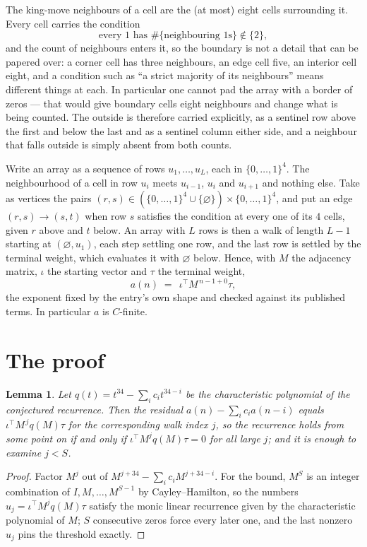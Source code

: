 \documentclass[11pt,a4paper]{article}
\theoremstyle{plain}
\newtheorem{lemma}[theorem]{Lemma}
\theoremstyle{definition}
\begin{document}
The king-move neighbours of a cell are the (at most) eight cells surrounding it. Every cell
carries the condition
\[
\text{every }1\text{ has }\#\{\text{neighbouring }1\text{s}\}\notin\{2\},
\]
and the count of neighbours enters it, so the boundary is not a detail that can be papered
over: a corner cell has three neighbours, an edge cell five, an interior cell eight, and a
condition such as ``a strict majority of its neighbours'' means different things at each. In
particular one cannot pad the array with a border of zeros --- that would give boundary cells
eight neighbours and change what is being counted. The outside is therefore carried
explicitly, as a sentinel row above the first and below the last and as a sentinel column
either side, and a neighbour that falls outside is simply absent from both counts.

Write an array as a sequence of rows $u_1,\dots,u_L$, each in
$\{0,\dots,1\}^{4}$. The neighbourhood of a cell in row $u_i$ meets $u_{i-1}$,
$u_i$ and $u_{i+1}$ and nothing else. Take as vertices the pairs
$(r,s)\in(\{0,\dots,1\}^{4}\cup\{\varnothing\})\times\{0,\dots,1\}^{4}$,
and put an edge $(r,s)\to(s,t)$ when row $s$ satisfies the condition at every one of its
$4$ cells, given $r$ above and $t$ below. An array with $L$ rows is then a walk of length
$L-1$ starting at $(\varnothing,u_1)$, each step settling one row, and the last row is
settled by the terminal weight, which evaluates it with $\varnothing$ below. Hence,
with $M$ the adjacency matrix, $\iota$ the starting vector and $\tau$ the terminal weight,
\[
a(n)\;=\;\,\iota^{\!\top}M^{\,n-1+0}\tau ,
\]
the exponent fixed by the entry's own shape and checked against its published terms. In
particular $a$ is $C$-finite.

\section{The proof}

\begin{lemma}\label{lem:crit}
Let $q(t)=t^{34}-\sum_i c_it^{34-i}$ be the characteristic polynomial of the
conjectured recurrence. Then the residual $a(n)-\sum_ic_ia(n-i)$ equals
$\iota^{\!\top}M^{\,j}q(M)\tau$ for the corresponding walk index $j$, so the
recurrence holds from some point on if and only if $\iota^{\!\top}M^{j}q(M)\tau=0$ for all
large $j$; and it is enough to examine $j<S$.
\end{lemma}

\begin{proof}
Factor $M^{j}$ out of $M^{j+34}-\sum_ic_iM^{j+34-i}$. For the bound, $M^{S}$
is an integer combination of $I,M,\dots,M^{S-1}$ by Cayley--Hamilton, so the numbers
$u_j=\iota^{\!\top}M^{j}q(M)\tau$ satisfy the monic linear recurrence given by the
characteristic polynomial of $M$; $S$ consecutive zeros force every later one, and the last
nonzero $u_j$ pins the threshold exactly.
\end{proof}
\end{document}
